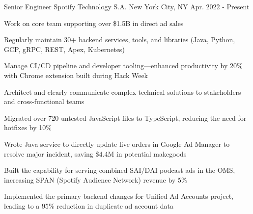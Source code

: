 

\begin{cventries}

  \cventry
    {Senior Engineer} %
    {Spotify Technology S.A.} %
    {New York City, NY} %
    {Apr. 2022 - Present} %
    {
      \begin{cvitems} 
        \item {Work on core team supporting over \$1.5B in direct ad sales}
        \item {Regularly maintain 30+ backend services, tools, and libraries (Java, Python, GCP, gRPC, REST, Apex, Kubernetes)}
        \item {Manage CI/CD pipeline and developer tooling---enhanced productivity by 20\% with Chrome extension built during Hack Week}
        \item {Architect and clearly communicate complex technical solutions to stakeholders and cross-functional teams}
        \item {Migrated over 720 untested JavaScript files to TypeScript, reducing the need for hotfixes by 10\%}
        \item {Wrote Java service to directly update live orders in Google Ad Manager to resolve major incident, saving \$4.4M in potential makegoods}
        \item {Built the capability for serving combined SAI/DAI podcast ads in the OMS, increasing SPAN (Spotify Audience Network) revenue by 5\%}
        \item {Implemented the primary backend changes for Unified Ad Accounts project, leading to a 95\% reduction in duplicate ad account data}
      \end{cvitems}
    }


\end{cventries}
